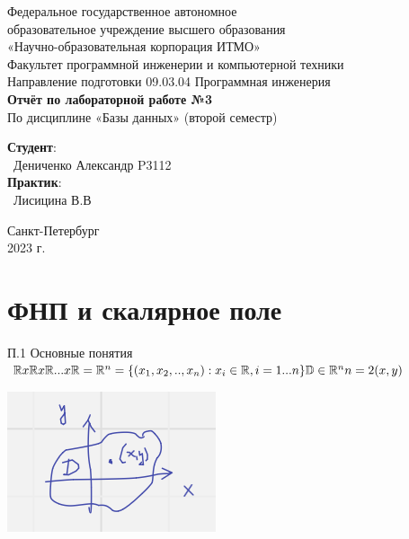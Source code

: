 \documentclass{article}
\begin{document}
\begin{center}
    \Large
    Федеральное государственное автономное \\
    образовательное учреждение высшего образования \\ 
    «Научно-образовательная корпорация ИТМО»\\
    \vspace{0.5cm}
    \large
    Факультет программной инженерии и компьютерной техники \\
    Направление подготовки 09.03.04 Программная инженерия \\
    \vspace{1cm}
    \Large
    \textbf{Отчёт по лабораторной работе №3} \\
    По дисциплине «Базы данных» (второй семестр)\\
    \large
    \vspace{8cm}

    \begin{minipage}{.33\textwidth}
    \end{minipage}
    \hfill
    \begin{minipage}{.4\textwidth}
    
        \textbf{Студент}: \vspace{.1cm} \\
        \ Дениченко Александр P3112\\
        \textbf{Практик}:  \\
        \ Лисицина В.В
    \end{minipage}
    \vfill
Санкт-Петербург\\ 2023 г.
\end{center}

\newpage

\section{ФНП и скалярное поле}
П.1 Основные понятия\\


$\mathbb{R} x \mathbb{R} x \mathbb{R} ... x \mathbb{R} = \mathbb{R}^n = \{(x_1, x_2, .., x_n): x_i \in \mathbb{R}, i = 1 ... n\}\\
\mathbb{D} \in \mathbb{R}^n \\
n = 2 (x,y)$


\includegraphics[width=.3\textwidth]{1.1} 
\end{document}
